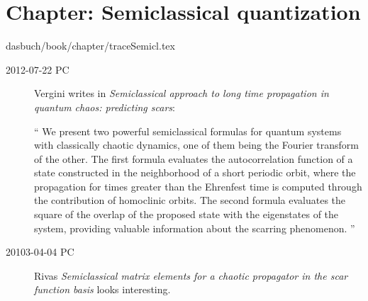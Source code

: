 \section{Chapter: Semiclassical quantization}
\label{c-traceSemicl}\noindent dasbuch/book/chapter/traceSemicl.tex

\begin{description}
\item[2012-07-22 PC]
Vergini writes in {\em Semiclassical approach to long time
propagation in quantum chaos: predicting scars}:

``
We present two powerful semiclassical formulas for quantum systems with
classically chaotic dynamics, one of them being the Fourier transform of
the other. The first formula evaluates the autocorrelation function of a
state constructed in the neighborhood of a short periodic orbit, where
the propagation for times greater than the Ehrenfest time is computed
through the contribution of homoclinic orbits. The second formula
evaluates the square of the overlap of the proposed state with the
eigenstates of the system, providing valuable information about the
scarring phenomenon.
''

\item[20103-04-04 PC] Rivas
{\em Semiclassical matrix elements for a chaotic propagator in
         the scar function basis} looks interesting.

\end{description}

%
%
%
%
%
%
%
%
%
%
%
%
%

